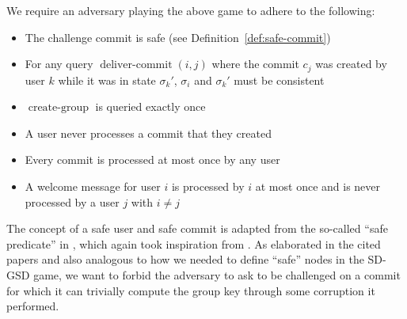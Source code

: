\begin{definition}
	We require an adversary playing the above game to adhere to the following:
	\begin{itemize}
		\item The challenge commit is safe (see Definition~\vref{def:safe-commit}) 
		\item For any query $\operatorname{deliver-commit}(i, j)$ where the commit $c_j$ was created by user $k$ while it was in state $\sigma_k'$, $\sigma_i$ and $\sigma_k'$ must be consistent
		\item $\operatorname{create-group}$ is queried exactly once 
		\item A user never processes a commit that they created
		\item Every commit is processed at most once by any user
		\item A welcome message for user $i$ is processed by $i$ at most once and is never processed by a user $j$ with $i \neq j$
	\end{itemize}

\end{definition}

The concept of a safe user and safe commit is adapted from the so-called ``safe predicate'' in \cite{ttkem}, which again took inspiration from \cite{rtreekem}. As elaborated in the cited papers and also analogous to how we needed to define ``safe'' nodes in the SD-GSD game, we want to forbid the adversary to ask to be challenged on a commit for which it can trivially compute the group key through some corruption it performed.

